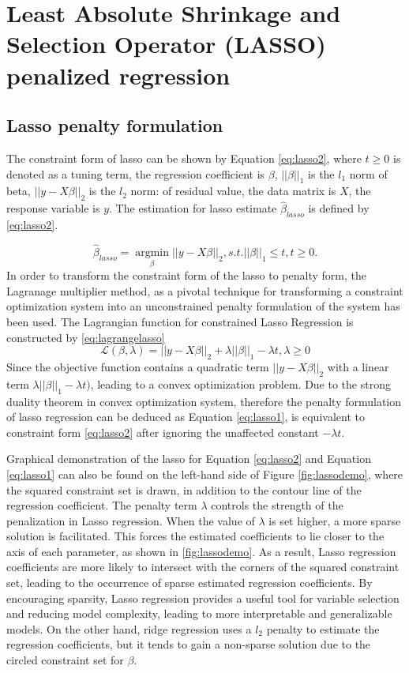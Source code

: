 \section{Least Absolute Shrinkage and Selection Operator (LASSO) penalized regression}
\subsection{Lasso penalty formulation}
The constraint form of lasso can be shown by Equation \ref{eq:lasso2}, where $t \geq 0$ is denoted as a tuning term, the regression coefficient is $\beta$, $||\beta||_1$ is the $l_1$ norm of beta, $||y-X\beta||_2$ is the $l_2$ norm: of residual value, the data matrix is $X$, the response variable is $y$. The estimation for lasso estimate $\hat{\beta}_{lasso}$ is defined by \autoref{eq:lasso2}. 

\begin{equation}
	\label{eq:lasso2}
	\hat{\beta}_{lasso} = \underset{\beta}{\operatorname{argmin}} ||y-X\beta||_2, s.t. ||\beta||_1 \leq t, t \geq 0.
\end{equation}
In order to transform the constraint form of the lasso to penalty form, the Lagranage multiplier method, as a pivotal technique for transforming a constraint optimization system into an unconstrained penalty formulation of the system has been used. The Lagrangian function for constrained Lasso Regression is constructed by \autoref{eq:lagrangelasso}
\begin{equation}
	\label{eq:lagrangelasso}
	\mathcal{L}(\beta,\lambda) =  ||y-X\beta||_2 + \lambda||\beta||_1 - \lambda t, \lambda \geq 0
\end{equation}
Since the objective function contains a quadratic term $||y-X\beta||_2$ with a linear term $\lambda||\beta||_1 - \lambda t)$, leading to a convex optimization problem. Due to the strong duality theorem in convex optimization system, therefore the penalty formulation of lasso regression can be deduced as Equation \autoref{eq:lasso1}, is equivalent to constraint form \autoref{eq:lasso2} after ignoring the unaffected constant $-\lambda t$.


Graphical demonstration of the lasso for Equation \ref{eq:lasso2} and Equation \ref{eq:lasso1} can also be found on the left-hand side of Figure \ref{fig:lassodemo}, where the squared constraint set is drawn, in addition to the contour line of the regression coefficient. The penalty term $\lambda$ controls the strength of the penalization in Lasso regression. When the value of $\lambda$ is set higher, a more sparse solution is facilitated. This forces the estimated coefficients to lie closer to the axis of each parameter, as shown in \ref{fig:lassodemo}. As a result, Lasso regression coefficients are more likely to intersect with the corners of the squared constraint set, leading to the occurrence of sparse estimated regression coefficients. By encouraging sparsity, Lasso regression provides a useful tool for variable selection and reducing model complexity, leading to more interpretable and generalizable models. On the other hand, ridge regression uses a $l_2$ penalty to estimate the regression coefficients, but it tends to gain a non-sparse solution due to the circled constraint set for $\beta$.

